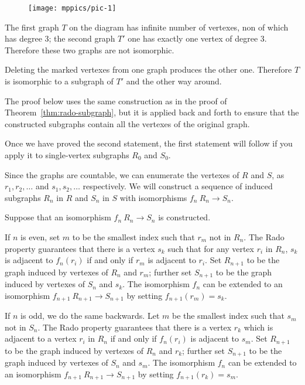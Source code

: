 \begin{figure}[h!]%
\vskip-0mm
\centering
\texttt{[image: mppics/pic-1]}
\vskip-0mm
\end{figure}
 
The first graph $T$ on the diagram has infinite number of vertexes, non of which has degree 3;
the second graph $T'$ one has exactly one vertex of degree 3. 
Therefore these two graphs are not isomorphic.

Deleting the marked vertexes from one graph produces the other one. 
Therefore $T$ is isomorphic to a subgraph of $T'$ and the other way around.

The proof below uses the same construction as in the proof of Theorem~\ref{thm:rado-subgraph}, but it is applied back and forth to ensure that the constructed subgraphs contain all the vertexes of the original graph.


Once we have proved the second statement,
the first statement will follow if you apply it to single-vertex subgraphs $R_0$ and $S_0$.

Since the graphs are countable,
we can enumerate the vertexes of $R$ and $S$, as $r_1 , r_2 , \dots$ and $s_1, s_2,\dots$ respectively. 
We will construct a sequence of induced subgraphs $R_n$ in $R$ and $S_n$ in $S$ with isomorphisms $f_n\:R_n\to S_n$.

Suppose that an isomorphism $f_n\:R_n\to S_n$ is constructed. 

If $n$ is even, set $m$ to be the smallest index such that $r_m$ not in $R_n$.
The Rado property guarantees that there is a vertex $s_k$ such that for any vertex $r_i$ in $R_n$, $s_k$ is adjacent to $f_n(r_i)$ if and only if $r_m$ is adjacent to $r_i$.
Set $R_{n+1}$ to be the graph induced by vertexes of $R_n$ and $r_m$;
further set $S_{n+1}$ to be the graph induced by vertexes of $S_n$ and $s_k$.
The isomorphism $f_n$ can be extended to an isomorphism $f_{n+1}\:R_{n+1}\to S_{n+1}$ by
setting $f_{n+1}(r_m)=s_k$.  

If $n$ is odd, we do the same backwards.
Let $m$ be the smallest index such that $s_m$ not in $S_n$.
The Rado property guarantees that there is a vertex $r_k$ which is adjacent to a vertex $r_i$ in $R_n$ if and only if $f_n(r_i)$ is adjacent to $s_m$.
Set $R_{n+1}$ to be the graph induced by vertexes of $R_n$ and $r_k$;
further set $S_{n+1}$ to be the graph induced by vertexes of $S_n$ and $s_m$.
The isomorphism $f_n$ can be extended to an isomorphism $f_{n+1}\:R_{n+1}\to S_{n+1}$ by
setting $f_{n+1}(r_k)=s_m$.

